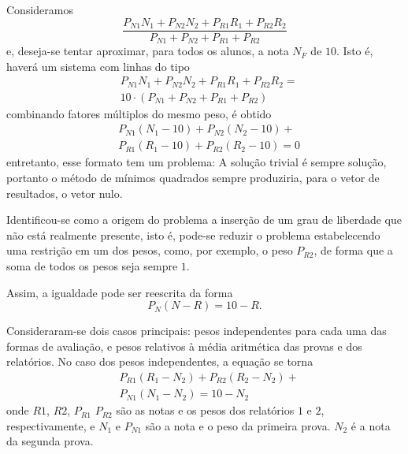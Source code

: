 \documentclass[11pt, twocolumn]{article}
\begin{document}
		Consideramos 
                \begin{equation}
			\frac{P_{N1}N_1 + P_{N2}N_2 + 
			      P_{R1}R_1 + P_{R2}R_2}
			     {P_{N1} + P_{N2} + 
			      P_{R1} + P_{R2}}
                \end{equation}
		e, deseja-se tentar aproximar, para todos os 
		alunos, a nota $N_F$ de $10$. Isto é, haverá 
		um sistema com linhas do tipo 
                \begin{equation*}
			\begin{split}
				& P_{N1}N_1 + P_{N2}N_2 + 
				  P_{R1}R_1 + P_{R2}R_2 = \\
				& 10 \cdot
				  \left(
				  P_{N1} + P_{N2} + 
				  P_{R1} + P_{R2} 
				  \right)
			\end{split}
                \end{equation*}
		combinando fatores múltiplos do mesmo peso, 
		é obtido
                \begin{equation*}
			\begin{split}
				& P_{N1}(N_1 - 10) + 
				  P_{N2}(N_2 - 10) + \\ 
				& P_{R1}(R_1 - 10) + 
				  P_{R2}(R_2 - 10) = 0
			\end{split}
                \end{equation*}
		entretanto, esse formato tem um problema: A 
		solução trivial é sempre solução, portanto o 
		método de mínimos quadrados sempre produziria,
		para o vetor de resultados, o vetor nulo.

		Identificou-se como a origem do problema a 
		inserção de um grau de liberdade que não está 
		realmente presente, isto é, pode-se reduzir o 
		problema estabelecendo uma restrição em um dos
		pesos, como, por exemplo, o peso $P_{R2}$, de 
		forma que a soma de todos os pesos seja sempre
		$1$.

		Assim, a igualdade pode ser reescrita da forma	
		\begin{equation}
			P_{N}(N - R) =  10 - R.
			\label{SISTEMA_PESOS_SIMPLES}
		\end{equation}

		Consideraram-se dois casos principais: pesos 
		independentes para cada uma das formas de 
		avaliação, e pesos relativos à média aritmética
		das provas e dos relatórios. No caso dos pesos 
		independentes, a equação 
		\label{SISTEMA_PESOS_SIMPLES}
		se torna
		\begin{equation}
			\begin{split}
				& P_{R1}(R_1 - N_2) + 
				  P_{R2}(R_2 - N_2) + \\
				& P_{N1}(N_1 - N_2) = 10 - N_2
			\end{split}
			\label{SISTEMA_PESOS_INDEPENDENTES}
		\end{equation}
		onde $R1$, $R2$, $P_{R1}$ $P_{R2}$ são as notas
		e os pesos dos relatórios $1$ e $2$, 
		respectivamente, e $N_1$ e $P_{N1}$ são a nota
		e o peso da primeira prova. $N_2$ é a nota da 
		segunda prova. 
		
\end{document}
